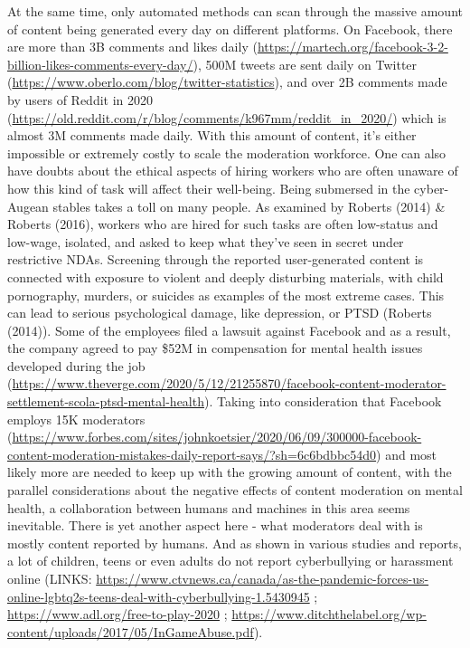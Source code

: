 \documentclass[
  10pt,
  dvipsnames,enabledeprecatedfontcommands]{scrartcl}
\begin{document}
At the same time, only automated methods can scan through the massive
amount of content being generated every day on different platforms. On
Facebook, there are more than 3B comments and likes daily
(\url{https://martech.org/facebook-3-2-billion-likes-comments-every-day/}),
500M tweets are sent daily on Twitter
(\url{https://www.oberlo.com/blog/twitter-statistics}), and over 2B
comments made by users of Reddit in 2020
(\url{https://old.reddit.com/r/blog/comments/k967mm/reddit_in_2020/})
which is almost 3M comments made daily. With this amount of content,
it's either impossible or extremely costly to scale the moderation
workforce. One can also have doubts about the ethical aspects of hiring
workers who are often unaware of how this kind of task will affect their
well-being. Being submersed in the cyber-Augean stables takes a toll on
many people. As examined by Roberts (2014) \& Roberts (2016), workers
who are hired for such tasks are often low-status and low-wage,
isolated, and asked to keep what they've seen in secret under
restrictive NDAs. Screening through the reported user-generated content
is connected with exposure to violent and deeply disturbing materials,
with child pornography, murders, or suicides as examples of the most
extreme cases. This can lead to serious psychological damage, like
depression, or PTSD (Roberts (2014)). Some of the employees filed a
lawsuit against Facebook and as a result, the company agreed to pay
\$52M in compensation for mental health issues developed during the job
(\url{https://www.theverge.com/2020/5/12/21255870/facebook-content-moderator-settlement-scola-ptsd-mental-health}).
Taking into consideration that Facebook employs 15K moderators
(\url{https://www.forbes.com/sites/johnkoetsier/2020/06/09/300000-facebook-content-moderation-mistakes-daily-report-says/?sh=6c6bdbbc54d0})
and most likely more are needed to keep up with the growing amount of
content, with the parallel considerations about the negative effects of
content moderation on mental health, a collaboration between humans and
machines in this area seems inevitable. There is yet another aspect here
- what moderators deal with is mostly content reported by humans. And as
shown in various studies and reports, a lot of children, teens or even
adults do not report cyberbullying or harassment online (LINKS:
\url{https://www.ctvnews.ca/canada/as-the-pandemic-forces-us-online-lgbtq2s-teens-deal-with-cyberbullying-1.5430945}
; \url{https://www.adl.org/free-to-play-2020} ;
\url{https://www.ditchthelabel.org/wp-content/uploads/2017/05/InGameAbuse.pdf}).
\end{document}
